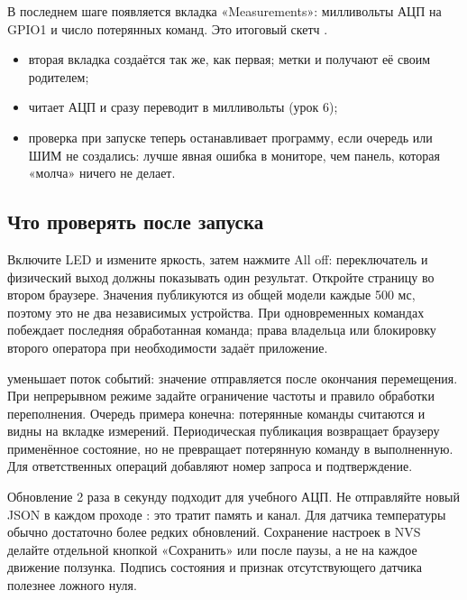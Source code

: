 В последнем шаге появляется вкладка «Measurements»: милливольты АЦП на GPIO1 и число потерянных команд.
Это итоговый скетч .


\begin{itemize}[leftmargin=*]
  \item вторая вкладка  создаётся так же, как первая; метки  и 
        получают её своим родителем;
  \item {} читает АЦП и сразу переводит в милливольты (урок 6);
  \item проверка при запуске теперь останавливает программу, если очередь или ШИМ не создались:
        лучше явная ошибка в мониторе, чем панель, которая «молча» ничего не делает.
\end{itemize}

\subsection{Что проверять после запуска}

Включите LED и измените яркость, затем нажмите All off: переключатель и физический выход
должны показывать один результат. Откройте страницу во втором браузере.
Значения публикуются из общей модели каждые 500 мс, поэтому это не два независимых устройства.
При одновременных командах побеждает последняя обработанная команда; права владельца
или блокировку второго оператора при необходимости задаёт приложение.

 уменьшает поток событий: значение отправляется после окончания
перемещения. При непрерывном режиме задайте ограничение частоты и правило обработки переполнения.
Очередь примера конечна: потерянные команды считаются и видны на вкладке измерений.
Периодическая публикация возвращает браузеру применённое состояние, но не превращает
потерянную команду в выполненную. Для ответственных операций добавляют номер запроса и подтверждение.

Обновление 2 раза в секунду подходит для учебного АЦП. Не отправляйте новый JSON в каждом проходе
: это тратит память и канал. Для датчика температуры обычно достаточно более редких
обновлений. Сохранение настроек в NVS делайте отдельной кнопкой «Сохранить» или после паузы,
а не на каждое движение ползунка. Подпись состояния и признак отсутствующего датчика полезнее
ложного нуля.

